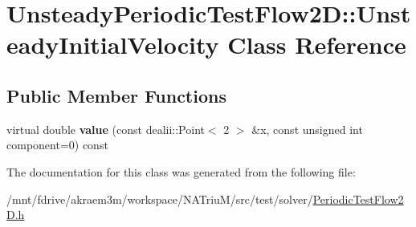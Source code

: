 \hypertarget{classUnsteadyPeriodicTestFlow2D_1_1UnsteadyInitialVelocity}{
\section{UnsteadyPeriodicTestFlow2D::UnsteadyInitialVelocity Class Reference}
\label{classUnsteadyPeriodicTestFlow2D_1_1UnsteadyInitialVelocity}
}
\subsection*{Public Member Functions}
\begin{DoxyCompactItemize}
\item 
\hypertarget{classUnsteadyPeriodicTestFlow2D_1_1UnsteadyInitialVelocity_a3539784b6b8def8ce1400864f3d27663}{
virtual double {\bfseries value} (const dealii::Point$<$ 2 $>$ \&x, const unsigned int component=0) const }
\label{classUnsteadyPeriodicTestFlow2D_1_1UnsteadyInitialVelocity_a3539784b6b8def8ce1400864f3d27663}

\end{DoxyCompactItemize}


The documentation for this class was generated from the following file:\begin{DoxyCompactItemize}
\item 
/mnt/fdrive/akraem3m/workspace/NATriuM/src/test/solver/\hyperlink{PeriodicTestFlow2D_8h}{PeriodicTestFlow2D.h}\end{DoxyCompactItemize}
